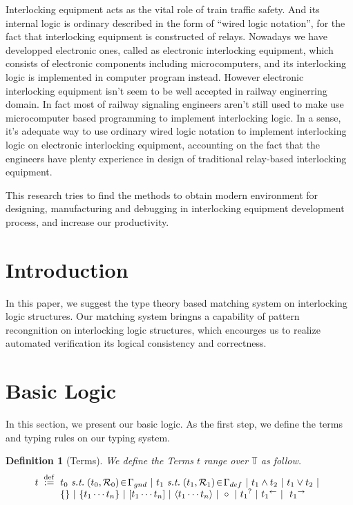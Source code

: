 \documentclass[12pt]{article}
\newtheorem{Definition}{Definition}[section]
\begin{document}
Interlocking equipment acts as the vital role of train traffic safety. And
its internal logic is ordinary described in the form of ``wired logic
notation'', for the fact that interlocking equipment is constructed of
relays.
Nowadays we have developped electronic ones, called as electronic
interlocking equipment, which consists of electronic components including
microcomputers, and its interlocking logic is implemented in computer
program instead.
However electronic interlocking equipment isn't seem to be well accepted in
railway enginerring domain. In fact most of railway signaling engineers
aren't still used to make use microcomputer based programming to implement
interlocking logic.
In a sense, it's adequate way to use ordinary wired logic notation to
implement interlocking logic on electronic interlocking equipment,
accounting on the fact that the engineers have plenty experience in design
of traditional relay-based interlocking equipment.

This research tries to find the methods to obtain modern environment
for designing, manufacturing and debugging in interlocking
equipment development process, and increase our productivity.


\section*{Introduction}
In this paper, we suggest the type theory based matching system on
interlocking logic structures. Our matching system bringns a capability of
pattern recongnition on interlocking logic structures, which encourges us to
realize automated verification its logical consistency and correctness.


\section*{Basic Logic}
In this section, we present our basic logic. As the first step, we define
the terms and typing rules on our typing system.

\begin{Definition}[Terms]
  We define the Terms $t$ range over $\mathbb{T}$ as follow.
  \[ t \;\stackrel{\mathrm{def}}{:=}\!
      \begin{array}[t]{l}
             t_0 \ \text{\it s.t.}\; (t_0, \mathcal{R}_0) \!\in\!
              \Gamma_{gnd}\ |\ 
             t_1 \ \text{\it s.t.}\; (t_1, \mathcal{R}_1) \!\in\!
              \Gamma_{def}\ |\
             t_1 \wedge t_2
        \ |\ t_1 \vee t_2 \ |  \\
        \{\} \ |\ \{t_1 \cdots t_n \}
        \ |\ [t_1 \cdots t_n ]
        \ |\ \langle t_1 \cdots t_n \rangle \ |\
        \circ \ |\  {t_1}^? \ |\ {t_1}^{\leftarrow} \ |\
        \ {t_1}^{\rightarrow} 
      \end{array}
  \]
\end{Definition}
\end{document}
